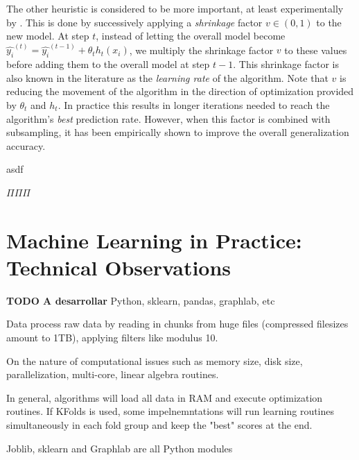 The other heuristic is considered to be more important, at least experimentally by \textcite{hastie-elemstatslearn}. This is done by successively applying a \textit{shrinkage} factor $v \in  (0,1)$ to the new model.  At step $t$, instead of letting the overall model become $ \hat{y_i}^{(t)} = \hat{y_i}^{(t-1)} +  \theta_t h_t(x_i) $, we multiply the shrinkage factor $v$ to these values before adding them to the overall model at step $t-1$. This shrinkage factor is also known in the literature as the \textit{learning rate} of the algorithm.  Note that $v$  is reducing the movement of the algorithm in the direction of optimization provided by $\theta_t$ and $h_t$. In practice this results in longer iterations needed to reach the algorithm's \textit{best} prediction rate. However, when this factor is combined with subsampling, it has been empirically shown to improve the overall generalization accuracy.



asdf

$\Pi \Pi \Pi$


\section{Machine Learning in Practice: Technical Observations}\label{section-technicalObservations}
\textbf{TODO A desarrollar}
Python, sklearn, pandas, graphlab, etc

Data process raw data by reading in chunks from huge files (compressed filesizes amount to 1TB), applying filters like modulus 10.

On the nature of computational issues such as memory size, disk size, parallelization, multi-core, linear algebra routines.

In general, algorithms will load all data in RAM and execute optimization routines. If KFolds is used, some impelnemntations will run learning routines simultaneously in each fold group and keep the "best" scores at the end.

Joblib, sklearn and Graphlab are all Python modules
